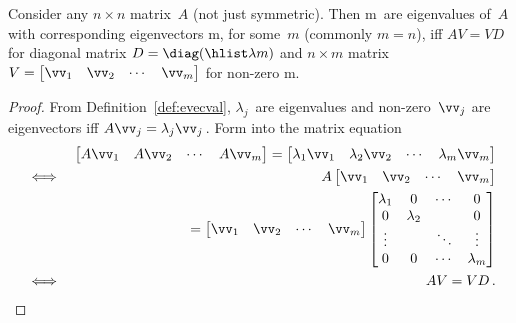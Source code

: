 \begin{theorem} \label{thm:avvd}
Consider any \(n\times n\) matrix~\(A\) (not just symmetric).
Then \hlist\lambda m\ are eigenvalues of~\(A\) with corresponding eigenvectors \hlist\vv m, for some~\(m\) (commonly \(m=n\)), iff \(AV=VD\) for diagonal matrix \(D=\diag(\hlist\lambda m)\) and \(n\times m\) matrix \(V=\begin{bmatrix} \vv_1&\vv_2&\cdots&\vv_m \end{bmatrix}\) for non-zero \hlist\vv m.
\end{theorem}

\begin{proof} 
From Definition~\ref{def:evecval}, \(\lambda_j\)~are eigenvalues and non-zero~\(\vv_j\) are eigenvectors iff \(A\vv_j=\lambda_j\vv_j\)\,.
Form into the matrix equation
\begin{eqnarray*}&&
\begin{bmatrix} A\vv_1&A\vv_2&\cdots&A\vv_m \end{bmatrix}
=\begin{bmatrix} \lambda_1\vv_1&\lambda_2\vv_2&\cdots&\lambda_m\vv_m \end{bmatrix}
\\&\iff&
A\begin{bmatrix} \vv_1&\vv_2&\cdots&\vv_m \end{bmatrix}
\\&&{}
=\begin{bmatrix} \vv_1&\vv_2&\cdots&\vv_m \end{bmatrix}
\begin{bmatrix} \lambda_1&0&\cdots&0
\\0&\lambda_2&&0
\\\vdots&&\ddots&\vdots
\\0&0&\cdots&\lambda_m \end{bmatrix}
\\&\iff&AV=VD\,.
\end{eqnarray*}
\end{proof}



